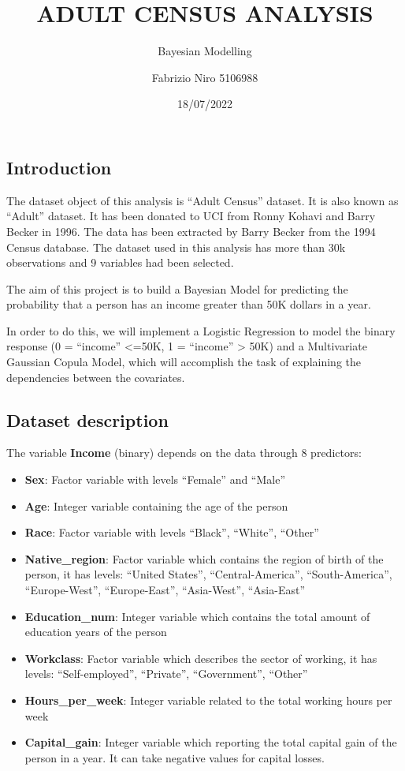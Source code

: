 \documentclass[
]{article}
\title{ADULT CENSUS ANALYSIS}
\subtitle{Bayesian Modelling}
\author{Fabrizio Niro 5106988}
\date{18/07/2022}
\begin{document}
\maketitle

\hypertarget{introduction}{%
\subsection{Introduction}\label{introduction}}

The dataset object of this analysis is ``Adult Census'' dataset. It is
also known as ``Adult'' dataset. It has been donated to UCI from Ronny
Kohavi and Barry Becker in 1996. The data has been extracted by Barry
Becker from the 1994 Census database. The dataset used in this analysis
has more than 30k observations and 9 variables had been selected.

The aim of this project is to build a Bayesian Model for predicting the
probability that a person has an income greater than 50K dollars in a
year.

In order to do this, we will implement a Logistic Regression to model
the binary response (0 = ``income'' \textless=50K, 1 = ``income''
\textgreater{} 50K) and a Multivariate Gaussian Copula Model, which will
accomplish the task of explaining the dependencies between the
covariates.

\hypertarget{dataset-description}{%
\subsection{Dataset description}\label{dataset-description}}

The variable \textbf{Income} (binary) depends on the data through 8
predictors:

\begin{itemize}
\item
  \textbf{Sex}: Factor variable with levels ``Female'' and ``Male''
\item
  \textbf{Age}: Integer variable containing the age of the person
\item
  \textbf{Race}: Factor variable with levels ``Black'', ``White'',
  ``Other''
\item
  \textbf{Native\_region}: Factor variable which contains the region of
  birth of the person, it has levels: ``United States'',
  ``Central-America'', ``South-America'', ``Europe-West'',
  ``Europe-East'', ``Asia-West'', ``Asia-East''
\item
  \textbf{Education\_num}: Integer variable which contains the total
  amount of education years of the person
\item
  \textbf{Workclass}: Factor variable which describes the sector of
  working, it has levels: ``Self-employed'', ``Private'',
  ``Government'', ``Other''
\item
  \textbf{Hours\_per\_week}: Integer variable related to the total
  working hours per week
\item
  \textbf{Capital\_gain}: Integer variable which reporting the total
  capital gain of the person in a year. It can take negative values for
  capital losses.
\end{itemize}
\end{document}
